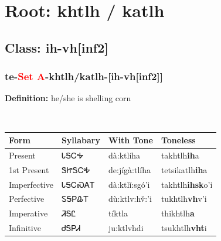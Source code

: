 \needspace{4in}
\section*{Root: khtlh / katlh}
\nopagebreak
{}
\needspace{3in}
\subsection*{Class: ih-vh[inf2]}
\nopagebreak
\needspace{2in}
\subsubsection*{te{-}\textcolor{Red}{Set A}{-}\textbf{khtlh/katlh}{-}[ih-vh[inf2]]}
\nopagebreak
\textbf{Definition: } he/she is shelling corn
\\[0.5em]
\begin{tabularx}{\textwidth}{l X X X}%
\toprule%
\textbf{Form}&\textbf{Syllabary}&\textbf{With Tone}&\textbf{Toneless}\\%
\midrule%
Present&ᏓᎦᏟᎭ&dà:ktlíha&takhtlh\textbf{ih}a\\%
1st Present&ᏕᏥᎦᏟᎭ&de:jígà:tlíha&tetsikatlh\textbf{ih}a\\%
Imperfective&ᏓᎦᏟᏍᎪᎢ&dà:ktlǐ:sgó’i&takhtlh\textbf{ihsk}o'i\\%
Perfective&ᏚᎦᏢᎲᎢ&dù:ktlv:hv̌:’i&tukhtlh\textbf{vh}v'i\\%
Imperative&ᏘᎦᏝ&tíktla&thikhtlh\textbf{a}\\%
Infinitive&ᏧᎦᏢᏗ&ju:ktlvhdi&tsukhtlh\textbf{vht}i\\%
\bottomrule%
\end{tabularx}
\\[1em]